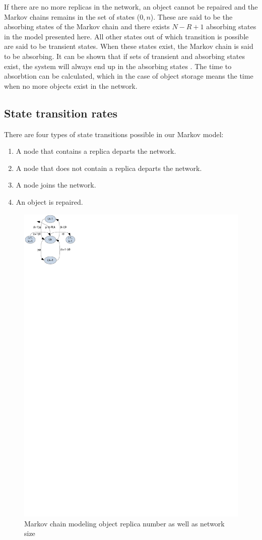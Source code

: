 \documentclass[10pt,a4paper,conference]{IEEEtran}
\begin{document}
If there are no more replicas in the network, an object cannot be repaired and the Markov chains remains in the set of states ($0,n$). These are said to be the absorbing states of the Markov chain and there exists $N - R + 1$ absorbing states in the model presented here. All other states out of which transition is possible are said to be transient states. When these states exist, the Markov chain is said to be absorbing. It can be shown that if sets of transient and absorbing states exist, the system will always end up in the absorbing states \cite{grinstead1997introduction_probability}. The time to absorbtion can be calculated, which in the case of object storage means the time when no more objects exist in the network.

\subsection{State transition rates}

There are four types of state transitions possible in our Markov model:
\begin{enumerate}
\item A node that contains a replica departs the network.
\item A node that does not contain a replica departs the network.
\item A node joins the network.
\item An object is repaired.
\end{enumerate}


\begin{figure}[htbp]
 \centering
 \includegraphics[clip=true, viewport=0.0cm 24.5cm 5.0cm 30cm, width=0.6\columnwidth]{Markov_example}
 \caption{Markov chain modeling object replica number as well as network size}
 \label{fig_markov_example}
\end{figure}
\end{document}
